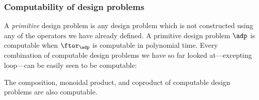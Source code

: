 \subsubsection{Computability of design problems}

A \emph{primitive} design problem is any design problem which is not constructed using any of the operators we have already defined.
A primitive design problem $\adp$ is computable when $\ftor_\adp$ is computable in polynomial time.
Every combination of computable design problems we have so far looked at---excepting loop---can be easily seen to be computable:

\begin{proposition}
    The composition, monoidal product, and coproduct of computable design problems are also computable.
\end{proposition}

